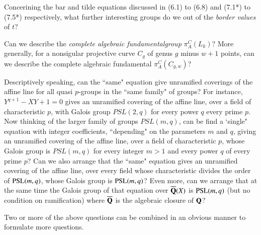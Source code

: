 \begin{question}\label{chap1-qus9.5}
Concerining the bar and tilde equations discussed in (6.1) to (6.8) and (7.1*) to (7.5*) respectively, what further interesting groups do we out of the \textit{border values} of $t$?
\end{question}

\begin{question}\label{chap1-qus9.6}
Can we describe the \textit{complete algebraic fundamental\break group} $\pi^{C}_{A}(L_{k})$? More generally, for a nonsigular projective curve $C_{g}$ of genus $g$ minus $w+1$ points, can we describe the complete algebraic fundamental $\pi^{C}_{A}(C_{g,w})$?
\end{question}

\begin{question}\label{chap1-qus9.7}
Descriptively speaking, can the ``same" equation give unramified coverings of the affine line for all quasi $p$-groups in the ``same family" of groups? For instance, $Y^{q+1}-XY+1 =0$ gives an unramified covering of the affine line, over a field of characteristic $p$, with Galois group $PSL(2,q)$ for every power $q$ every prime $p$. Now thinking of the larger family of groups $PSL(m,q)$, can be find a `single" equation with integer coefficients, ``depending" on the parameters $m$ and $q$, giving an unramified covering of the affine line, over a field of characteristic $p$, whose Galois group is $PSL(m,q)$ for every integer $m>1$ and every power $q$ of every prime $p$? Can we also arrange that the ``same" equation gives an unramified covering of the affine line, over every field whose characteristic divides the order of $\operatorname{PSL}(m,q)$, whose Galois group is $\operatorname{PSL}(m,q)$? Even more, can we arrange that at the same time the Galois group of that equation over $\overline{\mathbf{Q}}(X)$ is $\operatorname{PSL}(m,q)$ (but no condition on ramification) where $\overline{\mathbf{Q}}$ is the algebraic closure of $\mathbf{Q}$?
\end{question}

\setcounter{note}{7}
\begin{note}\label{chap1-note9.8}
Two or more of the above questions can be combined in an obvious manner to formulate more questions.
\end{note}

